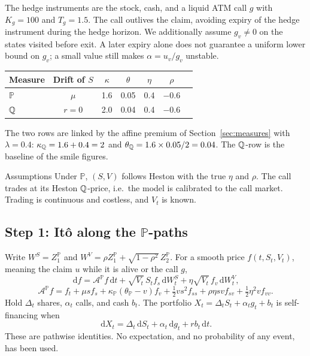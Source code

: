 \documentclass[10pt]{article}
\newcommand{\dd}{\,\mathrm d}\newcommand{\Pp}{\mathbb P}\newcommand{\Var}{\operatorname{Var}}\newcommand{\Cov}{\operatorname{Cov}}
\theoremstyle{definition}\newtheorem{definition}{Definition}[section]
\begin{document}
The hedge instruments are the stock, cash, and a liquid ATM call \(g\) with
\(K_g=100\) and \(T_g=1.5\). The call outlives the claim, avoiding expiry
of the hedge instrument during the hedge horizon. We additionally assume
\(g_v\ne0\) on the states visited before exit. A later expiry alone does
not guarantee a uniform lower bound on \(g_v\); a small value still makes
\(\alpha=u_v/g_v\) unstable.

\begin{center}
\begin{tabular}{lcccccc}
\toprule Measure & Drift of \(S\) & \(\kappa\) & \(\theta\) & \(\eta\) & \(\rho\)\\\midrule
\(\Pp\) & \(\mu\) & 1.6 & 0.05 & 0.4 & \(-0.6\)\\
\(\mathbb Q\) & \(r=0\) & 2.0 & 0.04 & 0.4 & \(-0.6\)\\\bottomrule
\end{tabular}
\end{center}
The two rows are linked by the affine premium of Section~\ref{sec:measures} with \(\lambda=0.4\):
\(\kappa_\mathbb Q=1.6+0.4=2\) and \(\theta_\mathbb Q=1.6\times0.05/2=0.04\). The
\(\mathbb Q\)-row is the baseline of the smile figures.

\begin{warningbox}{Assumptions}
Under \(\Pp\), \((S,V)\) follows Heston with the true \(\eta\) and \(\rho\).
The call trades at its Heston \(\mathbb Q\)-price, i.e.\ the model is calibrated to
the call market. Trading is continuous and costless, and \(V_t\) is known.
\end{warningbox}

\subsection{Step 1: It\^o along the \texorpdfstring{\(\Pp\)}{P}-paths}
Write \(W^S=Z_1^\Pp\) and \(W^V=\rho Z_1^\Pp+\sqrt{1-\rho^2}\,Z_2^\Pp\).
For a smooth price \(f(t,S_t,V_t)\), meaning the claim \(u\) while it is alive
or the call \(g\),
\[
\dd f=\mathcal A^\Pp f\dd t+\sqrt{V_t}\,S_tf_s\dd W_t^S+\eta\sqrt{V_t}\,f_v\dd W_t^V,
\]
\[
\mathcal A^\Pp f=f_t+\mu sf_s+\kappa_\Pp(\theta_\Pp-v)f_v
+\tfrac12vs^2f_{ss}+\rho\eta svf_{sv}+\tfrac12\eta^2vf_{vv}.
\]
Hold \(\Delta_t\) shares, \(\alpha_t\) calls, and cash \(b_t\). The portfolio
\(X_t=\Delta_tS_t+\alpha_tg_t+b_t\) is self-financing when
\[
\dd X_t=\Delta_t\dd S_t+\alpha_t\dd g_t+rb_t\dd t.
\]
These are pathwise identities. No expectation, and no probability of any
event, has been used.
\end{document}
